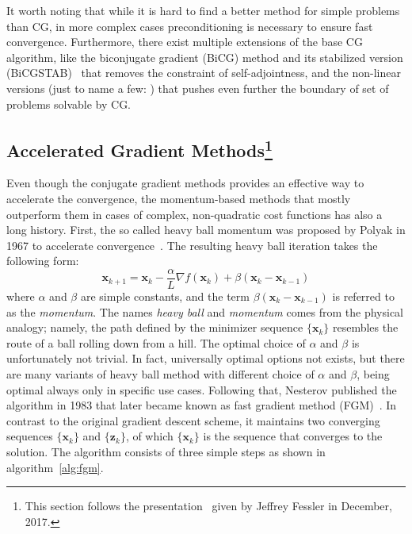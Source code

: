 It worth noting that while it is hard to find a better method for simple problems than CG, in more complex cases preconditioning is necessary to ensure fast convergence. Furthermore, there exist multiple extensions of the base CG algorithm, like the biconjugate gradient (BiCG) method and its stabilized version (BiCGSTAB)~\cite{van_der_vorst_bi-cgstab_1992} that removes the constraint of self-adjointness, and the non-linear versions (just to name a few: \cite{fletcher_function_1964, polak_note_1969, dai_nonlinear_1999}) that pushes even further the boundary of set of problems solvable by CG.

\subsection[Accelerated Gradient Methods]{Accelerated Gradient Methods\footnote{This section follows the presentation~\cite{kim_optimal_2017} given by Jeffrey Fessler in December, 2017.}}

Even though the conjugate gradient methods provides an effective way to accelerate the convergence, the momentum-based methods that mostly outperform them in cases of complex, non-quadratic cost functions has also a long history. First, the so called heavy ball momentum was proposed by Polyak in 1967 to accelerate convergence~\cite{polyak_methods_1964}. The resulting heavy ball iteration takes the following form:
\[\mathbf{x}_{k+1} = \mathbf{x}_k - \frac{\alpha}{L}\nabla f(\mathbf{x}_k) + \beta (\mathbf{x}_k - \mathbf{x}_{k-1})\]
where $\alpha$ and $\beta$ are simple constants, and the term $\beta (\mathbf{x}_k - \mathbf{x}_{k-1})$ is referred to as the \textit{momentum}. The names \textit{heavy ball} and \textit{momentum} comes from the physical analogy; namely, the path defined by the minimizer sequence $\{\mathbf{x}_k\}$ resembles the route of a ball rolling down from a hill. The optimal choice of $\alpha$ and $\beta$ is unfortunately not trivial. In fact, universally optimal options not exists, but there are many variants of heavy ball method with different choice of $\alpha$ and $\beta$, being optimal always only in specific use cases. Following that, Nesterov published the algorithm in 1983 that later became known as fast gradient method (FGM)~\cite{nesterov_method_1983}. In contrast to the original gradient descent scheme, it maintains two converging sequences $\{\mathbf{x}_k\}$ and $\{\mathbf{z}_k\}$, of which $\{\mathbf{x}_k\}$ is the sequence that converges to the solution. The algorithm consists of three simple steps as shown in algorithm~\ref{alg:fgm}.

